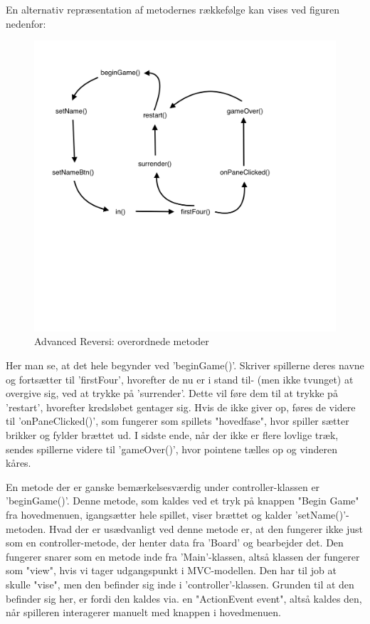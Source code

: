 En alternativ repræsentation af metodernes rækkefølge kan vises ved figuren nedenfor:
\begin{figure}[H]
    \centering
    \caption{Advanced Reversi: overordnede metoder}\label{ARF}
    \includegraphics[width=1.2\textwidth]{Graphics/Screenshot 2023-01-20 at 16.35.36.png}
\end{figure}
Her man se, at det hele begynder ved 'beginGame()'. Skriver spillerne deres navne og fortsætter til 'firstFour', hvorefter de nu er i stand til- (men ikke tvunget) at overgive sig, ved at trykke på 'surrender'. Dette vil føre dem til at trykke på 'restart', hvorefter kredsløbet gentager sig. Hvis de ikke giver op, føres de videre til 'onPaneClicked()', som fungerer som spillets "hovedfase", hvor spiller sætter brikker og fylder brættet ud. I sidste ende, når der ikke er flere lovlige træk, sendes spillerne videre til 'gameOver()', hvor pointene tælles op og vinderen kåres.

En metode der er ganske bemærkelsesværdig under controller-klassen er 'beginGame()'. Denne metode, som kaldes ved et tryk på knappen "Begin Game" fra hovedmenuen, igangsætter hele spillet, viser brættet og kalder 'setName()'-metoden. Hvad der er usædvanligt ved denne metode er, at den fungerer ikke just som en controller-metode, der henter data fra 'Board' og bearbejder det. Den fungerer snarer som en metode inde fra 'Main'-klassen, altså klassen der fungerer som "view", hvis vi tager udgangspunkt i MVC-modellen. Den har til job at skulle "vise", men den befinder sig inde i 'controller'-klassen. Grunden til at den befinder sig her, er fordi den kaldes via. en "ActionEvent event", altså kaldes den, når spilleren interagerer manuelt med knappen i hovedmenuen. 

